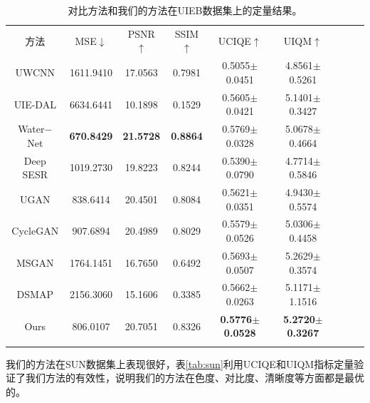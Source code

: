 \begin{table}[ht]%
\centering
\caption{对比方法和我们的方法在UIEB数据集上的定量结果。}
  \begin{tabular}{c|ccc|ccccc}
    \hline\noalign{\smallskip}
    方法 & MSE$\downarrow$ & PSNR$\uparrow$ & SSIM$\uparrow$ & UCIQE$\uparrow$ & UIQM$\uparrow$ \\
    \noalign{\smallskip}\hline\noalign{\smallskip}
    UWCNN\cite{li2020underwater} & 1611.9410 & 17.0563 & 0.7981 & 0.5055$\pm$0.0451 & 4.8561$\pm$0.5261 \\
    UIE-DAL\cite{uplavikar2019all} & 6634.6441 & 10.1898 & 0.1529 & 0.5605$\pm$0.0421 & 5.1401$\pm$0.3427 \\
    Water$-$Net\cite{li2019underwater} & \textbf{670.8429} & \textbf{21.5728} & \textbf{0.8864} & 0.5769$\pm$0.0328 & 5.0678$\pm$0.4664 \\
    Deep SESR\cite{islam2020simultaneous} & 1019.2730 & 19.8223 & 0.8244 & 0.5390$\pm$0.0790 & 4.7714$\pm$0.5846 \\
    UGAN\cite{fabbri2018enhancing} & 838.6414 & 20.4501 & 0.8084 & 0.5621$\pm$0.0351 & 4.9430$\pm$0.5574 \\
    CycleGAN\cite{zhu2017unpaired} & 907.6894 & 20.4989 & 0.8029 & 0.5579$\pm$0.0526 & 5.0306$\pm$0.4458 \\
    MSGAN\cite{mao2019mode} & 1764.1451 & 16.7650 & 0.6492 & 0.5693$\pm$0.0507 & 5.2629$\pm$0.3574 \\
    DSMAP\cite{chang2020domain} & 2156.3060 & 15.1606 & 0.3385 & 0.5662$\pm$0.0263 & 5.1171$\pm$1.1516 \\
    Ours & 806.0107 & 20.7051 & 0.8326 & \textbf{0.5776$\pm$0.0528} & \textbf{5.2720$\pm$0.3267} \\
    \noalign{\smallskip}\hline
  \end{tabular}
  \label{tab:UIEB}
\end{table}

我们的方法在SUN数据集上表现很好，表\ref{tab:sun}利用UCIQE和UIQM指标定量验证了我们方法的有效性，说明我们的方法在色度、对比度、清晰度等方面都是最优的。

